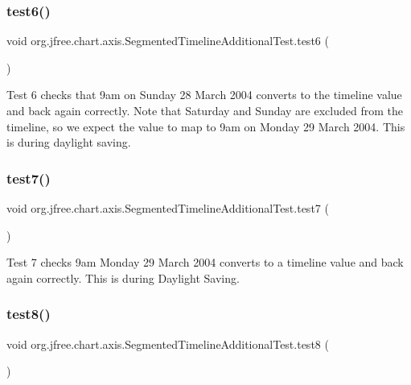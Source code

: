 \subsubsection{\texorpdfstring{test6()}{test6()}}
{\footnotesize\ttfamily void org.\+jfree.\+chart.\+axis.\+Segmented\+Timeline\+Additional\+Test.\+test6 (\begin{DoxyParamCaption}{ }\end{DoxyParamCaption})}

Test 6 checks that 9am on Sunday 28 March 2004 converts to the timeline value and back again correctly. Note that Saturday and Sunday are excluded from the timeline, so we expect the value to map to 9am on Monday 29 March 2004. This is during daylight saving. \mbox{\label{classorg_1_1jfree_1_1chart_1_1axis_1_1_segmented_timeline_additional_test_a724c9313080f43782a3845405eaf68f4}} 
\subsubsection{\texorpdfstring{test7()}{test7()}}
{\footnotesize\ttfamily void org.\+jfree.\+chart.\+axis.\+Segmented\+Timeline\+Additional\+Test.\+test7 (\begin{DoxyParamCaption}{ }\end{DoxyParamCaption})}

Test 7 checks 9am Monday 29 March 2004 converts to a timeline value and back again correctly. This is during Daylight Saving. \mbox{\label{classorg_1_1jfree_1_1chart_1_1axis_1_1_segmented_timeline_additional_test_a654a0ac31e56f57d0a672dedc0e4f478}} 
\subsubsection{\texorpdfstring{test8()}{test8()}}
{\footnotesize\ttfamily void org.\+jfree.\+chart.\+axis.\+Segmented\+Timeline\+Additional\+Test.\+test8 (\begin{DoxyParamCaption}{ }\end{DoxyParamCaption})}

